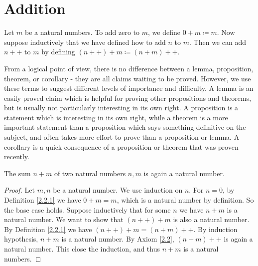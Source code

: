 \section{Addition}\label{sec 2.2}

\begin{definition}\label{2.2.1}
    Let \(m\) be a natural numbers.
    To add zero to \(m\), we define \(0+m \coloneqq m\).
    Now suppose inductively that we have defined how to add \(n\) to \(m\).
    Then we can add \(n++\) to \(m\) by defining \((n++) + m \coloneqq (n + m)++\).
\end{definition}

\begin{note}
    From a logical point of view, there is no difference between a lemma, proposition, theorem, or corollary
    - they are all claims waiting to be proved.
    However, we use these terms to suggest different levels of importance and difficulty.
    A lemma is an easily proved claim which is helpful for proving other propositions and theorems, but is usually not particularly interesting in its own right.
    A proposition is a statement which is interesting in its own right, while a theorem is a more important statement than a proposition which says something definitive on the subject, and often takes more effort to prove than a proposition or lemma.
    A corollary is a quick consequence of a proposition or theorem that was proven recently.
\end{note}

\begin{additional corollary}\label{ac 2.2.1}
The sum \(n + m\) of two natural numbers \(n, m\) is again a natural number.
\end{additional corollary}

\begin{proof}
    Let \(m, n\) be a natural number.
    We use induction on \(n\).
    For \(n = 0\), by Definition \ref{2.2.1} we have \(0 + m = m\), which is a natural number by definition.
    So the base case holds.
    Suppose inductively that for some \(n\) we have \(n + m\) is a natural number.
    We want to show that \((n++) + m\) is also a natural number.
    By Definition \ref{2.2.1} we have \((n++) + m = (n + m)++\).
    By induction hypothesis, \(n + m\) is a natural number.
    By Axiom \ref{2.2}, \((n + m)++\) is again a natural number.
    This close the induction, and thus \(n + m\) is a natural numbers.
\end{proof}

